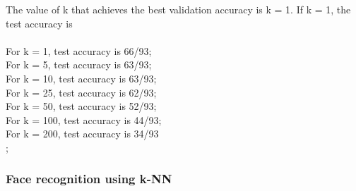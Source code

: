 \documentclass{article}
\begin{document}
The value of k that achieves the best validation accuracy is k = 1. If k = 1, the test accuracy is \\\\
For k = 1, test accuracy is 66/93;\\
For k = 5, test accuracy is 63/93;\\
For k = 10, test accuracy is 63/93;\\
For k = 25, test accuracy is 62/93;\\
For k = 50, test accuracy is 52/93;\\
For k = 100, test accuracy is 44/93;\\
For k = 200, test accuracy is 34/93\\;\\


\subsubsection{Face recognition using k-NN}
\end{document}
